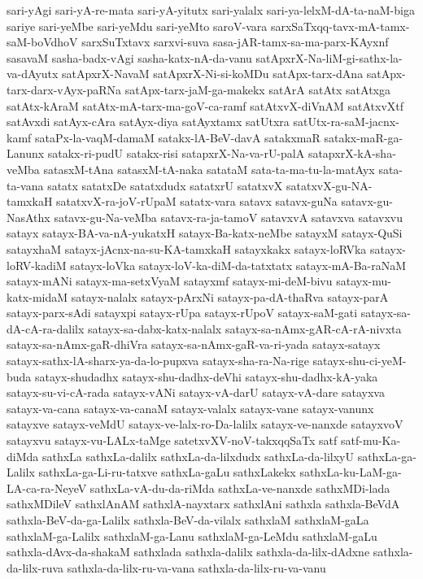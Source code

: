 {sari-yAgi
sari-yA-re-mata
sari-yA-yitutx
sari-yalalx
sari-ya-lelxM-dA-ta-naM-biga
sariye
sari-yeMbe
sari-yeMdu
sari-yeMto
saroV-vara
sarxSaTxqq-tavx-mA-tamx-saM-boVdhoV
sarxSuTxtavx
sarxvi-suva
sasa-jAR-tamx-sa-ma-parx-KAyxnf
sasavaM
sasha-badx-vAgi
sasha-katx-nA-da-vanu
satApxrX-Na-liM-gi-sathx-la-va-dAyutx
satApxrX-NavaM
satApxrX-Ni-si-koMDu
satApx-tarx-dAna
satApx-tarx-darx-vAyx-paRNa
satApx-tarx-jaM-ga-makekx
satArA
satAtx
satAtxga
satAtx-kAraM
satAtx-mA-tarx-ma-goV-ca-ramf
satAtxvX-diVnAM
satAtxvXtf
satAvxdi
satAyx-cAra
satAyx-diya
satAyxtamx
satUtxra
satUtx-ra-saM-jacnx-kamf
sataPx-la-vaqM-damaM
satakx-lA-BeV-davA
satakxmaR
satakx-maR-ga-Lanunx
satakx-ri-pudU
satakx-risi
satapxrX-Na-va-rU-palA
satapxrX-kA-sha-veMba
satasxM-tAna
satasxM-tA-naka
satataM
sata-ta-ma-tu-la-matAyx
sata-ta-vana
satatx
satatxDe
satatxdudx
satatxrU
satatxvX
satatxvX-gu-NA-tamxkaH
satatxvX-ra-joV-rUpaM
satatx-vara
satavx
satavx-guNa
satavx-gu-NasAthx
satavx-gu-Na-veMba
satavx-ra-ja-tamoV
satavxvA
satavxva
satavxvu
satayx
satayx-BA-va-nA-yukatxH
satayx-Ba-katx-neMbe
satayxM
satayx-QuSi
satayxhaM
satayx-jAcnx-na-su-KA-tamxkaH
satayxkakx
satayx-loRVka
satayx-loRV-kadiM
satayx-loVka
satayx-loV-ka-diM-da-tatxtatx
satayx-mA-Ba-raNaM
satayx-mANi
satayx-ma-setxVyaM
satayxmf
satayx-mi-deM-bivu
satayx-mu-katx-midaM
satayx-nalalx
satayx-pArxNi
satayx-pa-dA-thaRva
satayx-parA
satayx-parx-sAdi
satayxpi
satayx-rUpa
satayx-rUpoV
satayx-saM-gati
satayx-sa-dA-cA-ra-dalilx
satayx-sa-dabx-katx-nalalx
satayx-sa-nAmx-gAR-cA-rA-nivxta
satayx-sa-nAmx-gaR-dhiVra
satayx-sa-nAmx-gaR-va-ri-yada
satayx-satayx
satayx-sathx-lA-sharx-ya-da-lo-pupxva
satayx-sha-ra-Na-rige
satayx-shu-ci-yeM-buda
satayx-shudadhx
satayx-shu-dadhx-deVhi
satayx-shu-dadhx-kA-yaka
satayx-su-vi-cA-rada
satayx-vANi
satayx-vA-darU
satayx-vA-dare
satayxva
satayx-va-cana
satayx-va-canaM
satayx-valalx
satayx-vane
satayx-vanunx
satayxve
satayx-veMdU
satayx-ve-lalx-ro-Da-lalilx
satayx-ve-nanxde
satayxvoV
satayxvu
satayx-vu-LALx-taMge
satetxvXV-noV-takxqqSaTx
satf
satf-mu-Ka-diMda
sathxLa
sathxLa-dalilx
sathxLa-da-lilxdudx
sathxLa-da-lilxyU
sathxLa-ga-Lalilx
sathxLa-ga-Li-ru-tatxve
sathxLa-gaLu
sathxLakekx
sathxLa-ku-LaM-ga-LA-ca-ra-NeyeV
sathxLa-vA-du-da-riMda
sathxLa-ve-nanxde
sathxMDi-lada
sathxMDileV
sathxlAnAM
sathxlA-nayxtarx
sathxlAni
sathxla
sathxla-BeVdA
sathxla-BeV-da-ga-Lalilx
sathxla-BeV-da-vilalx
sathxlaM
sathxlaM-gaLa
sathxlaM-ga-Lalilx
sathxlaM-ga-Lanu
sathxlaM-ga-LeMdu
sathxlaM-gaLu
sathxla-dAvx-da-shakaM
sathxlada
sathxla-dalilx
sathxla-da-lilx-dAdxne
sathxla-da-lilx-ruva
sathxla-da-lilx-ru-va-vana
sathxla-da-lilx-ru-va-vanu
}
